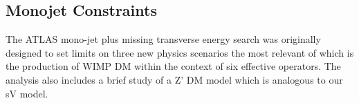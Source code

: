 

\subsection{Monojet Constraints}
\label{monojet_constraints}
The ATLAS mono-jet plus missing transverse energy search \cite{Aad:2015zva} was originally designed to set limits on three new physics scenarios\comm{,}
the most relevant of which is the production of WIMP DM within the context of six  effective operators. The analysis also includes a brief study of a Z' DM model which is analogous to our sV model.

